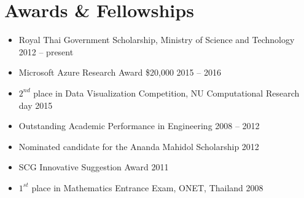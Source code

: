 \section{\sc Awards \& Fellowships}

\begin{itemize}[leftmargin=0cm, label={}]
\itemsep0em

\item Royal Thai Government Scholarship, Ministry of Science and Technology \hfill 2012 -- present

\item Microsoft Azure Research Award \$20,000 \hfill 2015 -- 2016

\item $2^{nd}$ place in Data Visualization Competition, NU Computational Research day \hfill 2015

\item Outstanding Academic Performance in Engineering	\hfill 2008 -- 2012

\item Nominated candidate for the Ananda Mahidol Scholarship \hfill 2012

\item SCG Innovative Suggestion Award	\hfill 2011

\item $1^{st}$ place in Mathematics Entrance Exam, ONET, Thailand \hfill 2008\\

\end{itemize}

